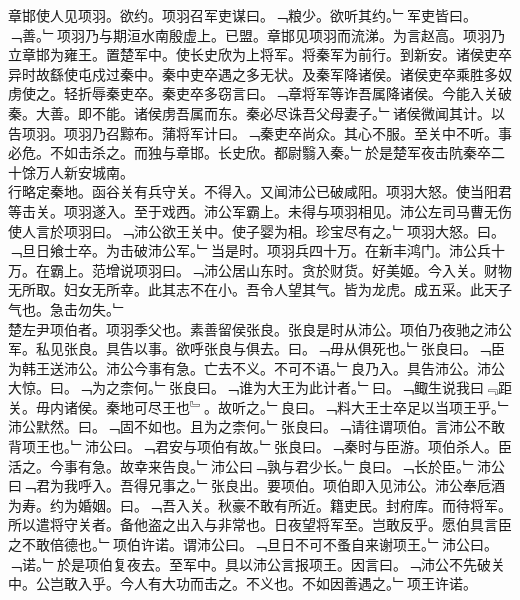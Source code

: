 \documentclass{zhvt-classic}
\begin{document}
\hspace*{2em}章邯使人见项羽。欲约。项羽召军吏谋曰。﹁粮少。欲听其约。﹂军吏皆曰。﹁善。﹂项羽乃与期洹水南殷虚上。已盟。章邯见项羽而流涕。为言赵高。项羽乃立章邯为雍王。置楚军中。使长史欣为上将军。将秦军为前行。到新安。诸侯吏卒异时故繇使屯戍过秦中。秦中吏卒遇之多无状。及秦军降诸侯。诸侯吏卒乘胜多奴虏使之。轻折辱秦吏卒。秦吏卒多窃言曰。﹁章将军等诈吾属降诸侯。今能入关破秦。大善。即不能。诸侯虏吾属而东。秦必尽诛吾父母妻子。﹂诸侯微闻其计。以告项羽。项羽乃召黥布。蒲将军计曰。﹁秦吏卒尚众。其心不服。至关中不听。事必危。不如击杀之。而独与章邯。长史欣。都尉翳入秦。﹂於是楚军夜击阬秦卒二十馀万人新安城南。\\
\hspace*{2em}行略定秦地。函谷关有兵守关。不得入。又闻沛公已破咸阳。项羽大怒。使当阳君等击关。项羽遂入。至于戏西。沛公军霸上。未得与项羽相见。沛公左司马曹无伤使人言於项羽曰。﹁沛公欲王关中。使子婴为相。珍宝尽有之。﹂项羽大怒。曰。﹁旦日飨士卒。为击破沛公军。﹂当是时。项羽兵四十万。在新丰鸿门。沛公兵十万。在霸上。范增说项羽曰。﹁沛公居山东时。贪於财货。好美姬。今入关。财物无所取。妇女无所幸。此其志不在小。吾令人望其气。皆为龙虎。成五采。此天子气也。急击勿失。﹂\\
\hspace*{2em}楚左尹项伯者。项羽季父也。素善留侯张良。张良是时从沛公。项伯乃夜驰之沛公军。私见张良。具告以事。欲呼张良与俱去。曰。﹁毋从俱死也。﹂张良曰。﹁臣为韩王送沛公。沛公今事有急。亡去不义。不可不语。﹂良乃入。具告沛公。沛公大惊。曰。﹁为之柰何。﹂张良曰。﹁谁为大王为此计者。﹂曰。﹁鲰生说我曰﹃距关。毋内诸侯。秦地可尽王也﹄。故听之。﹂良曰。﹁料大王士卒足以当项王乎。﹂沛公默然。曰。﹁固不如也。且为之柰何。﹂张良曰。﹁请往谓项伯。言沛公不敢背项王也。﹂沛公曰。﹁君安与项伯有故。﹂张良曰。﹁秦时与臣游。项伯杀人。臣活之。今事有急。故幸来告良。﹂沛公曰﹁孰与君少长。﹂良曰。﹁长於臣。﹂沛公曰﹁君为我呼入。吾得兄事之。﹂张良出。要项伯。项伯即入见沛公。沛公奉卮酒为寿。约为婚姻。曰。﹁吾入关。秋豪不敢有所近。籍吏民。封府库。而待将军。所以遣将守关者。备他盗之出入与非常也。日夜望将军至。岂敢反乎。愿伯具言臣之不敢倍德也。﹂项伯许诺。谓沛公曰。﹁旦日不可不蚤自来谢项王。﹂沛公曰。﹁诺。﹂於是项伯复夜去。至军中。具以沛公言报项王。因言曰。﹁沛公不先破关中。公岂敢入乎。今人有大功而击之。不义也。不如因善遇之。﹂项王许诺。\\
\end{document}
